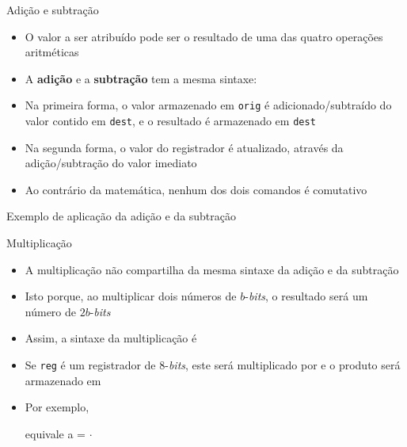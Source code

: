 \begin{frame}[fragile]{Adição e subtração}

    \begin{itemize}
        \item O valor a ser atribuído pode ser o resultado de uma das quatro operações
            aritméticas

        \item A \textbf{adição} e a \textbf{subtração} tem a mesma sintaxe:

        \item Na primeira forma, o valor armazenado em \texttt{orig} é adicionado/subtraído do
            valor contido em \texttt{dest}, e o resultado é armazenado em \texttt{dest}

        \item Na segunda forma, o valor do registrador é atualizado, através da adição/subtração
            do valor imediato

        \item Ao contrário da matemática, nenhum dos dois comandos é comutativo
    \end{itemize}

\end{frame}

\begin{frame}[fragile]{Exemplo de aplicação da adição e da subtração}
\end{frame}

\begin{frame}[fragile]{Multiplicação}

    \begin{itemize}
        \item A multiplicação não compartilha da mesma sintaxe da adição e da subtração

        \item Isto porque, ao multiplicar dois números de $b$-\textit{bits}, o resultado será um
            número de $2b$-\textit{bits}

        \item Assim, a sintaxe da multiplicação é


        \item Se \texttt{reg} é um registrador de 8-\textit{bits}, este será multiplicado por
             e o produto será armazenado em 

        \item Por exemplo,


        equivale a  = $\cdot$
    \end{itemize}

\end{frame}
